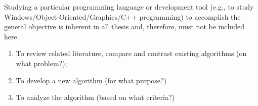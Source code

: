 Studying a particular programming language or development tool (e.g., to study Windows/Object-Oriented/Graphics/C++ programming) to  accomplish the general objective is inherent in all thesis and, therefore, must not be included here.

%
%

\begin{enumerate}
   \item To review related literature, compare and contrast existing algorithms (on what problem?);
   \item To develop a new algorithm (for what purpose?)
   \item To analyze the algorithm (based on what criteria?)
\end{enumerate}


